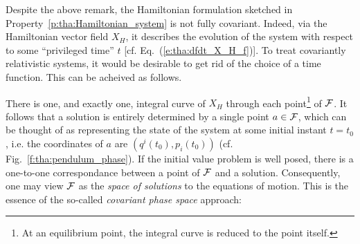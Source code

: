 Despite the above remark, the Hamiltonian formulation sketched in
Property~\ref{p:tha:Hamiltonian_system} is not fully covariant.
Indeed, via the Hamiltonian
vector field $X_H$, it describes the evolution of the system with
respect to some ``privileged time'' $t$ [cf. Eq.~(\ref{e:tha:dfdt_X_H_f})].
To treat covariantly relativistic systems, it would be desirable to get
rid of the choice of a time function. This can be acheived as follows.

There is one, and exactly one,
integral curve of $X_H$ through each point\footnote{At an equilibrium point, the
integral curve is reduced to the point itself.} of $\mathcal{F}$.
It follows that a solution is entirely determined by a single point $a\in\mathcal{F}$,
which can be thought of as representing the state of the system at some initial
instant $t=t_0$, i.e. the coordinates of $a$ are $(q^i(t_0),p_i(t_0))$
(cf. Fig.~\ref{f:tha:pendulum_phase}).
If the initial value problem is well posed, there is a one-to-one
correspondance between a point of $\mathcal{F}$ and a solution.
Consequently, one may view $\mathcal{F}$ as the \emph{space of solutions}
to the equations of motion.
This is the essence of the
so-called \emph{covariant phase space} approach:

